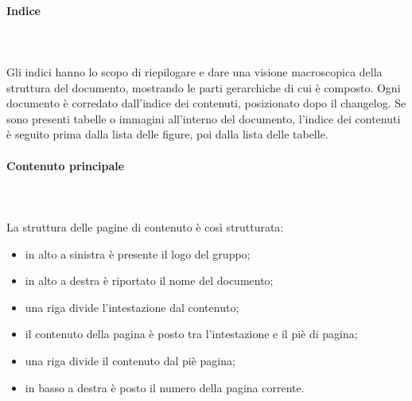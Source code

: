 		\paragraph{Indice} \mbox{}\\ \mbox{}\\
		Gli indici hanno lo scopo di riepilogare e dare una visione macroscopica della struttura del documento, mostrando le parti gerarchiche di cui è composto.\newline 
		Ogni documento è corredato dall'indice dei contenuti, posizionato dopo il changelog\glo. Se sono presenti tabelle o immagini all'interno del documento, l'indice dei contenuti è seguito prima dalla lista delle figure, poi dalla lista delle tabelle.
		\paragraph{Contenuto principale} \mbox{}\\ \mbox{}\\
		La struttura delle pagine di contenuto è così strutturata:
		\begin{itemize}
			\item in alto a sinistra è presente il logo del gruppo;
			\item in alto a destra è riportato il nome del documento;
			\item una riga divide l'intestazione dal contenuto;
			\item il contenuto della pagina è posto tra l'intestazione e il piè di pagina;
			\item una riga divide il contenuto dal piè pagina;
			\item in basso a destra è posto il numero della pagina corrente.
		\end{itemize}
